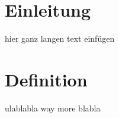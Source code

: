 \section{Einleitung}
hier ganz langen text einfügen

\section{Definition}
ulablabla
\cite{lee2013introduction}
way more blabla

\printbibliography
